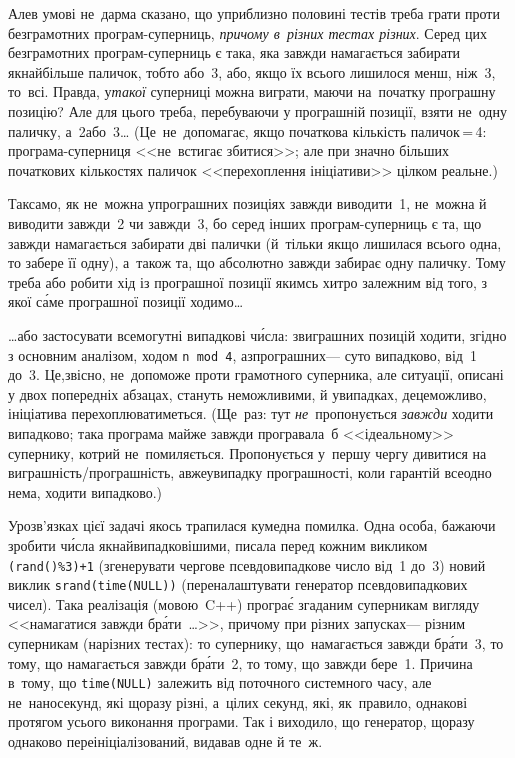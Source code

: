 Але\nolinebreak[2] в умові не~дарма сказано, що у\nolinebreak[3] приблизно половині тестів треба грати проти безграмотних програм-суперниць, \emph{причому в~різних тестах різних}. Серед цих безграмотних програм-суперниць є така, яка завжди намагається забирати якнайбільше паличок, тобто або~3, або, якщо їх всього лишилося менш, ніж~3, то~всі. Правда, у\nolinebreak[2] \emph{такої} суперниці можна виграти, маючи на~початку програшну позицію? Але для цього треба, перебуваючи у програшній позиції, взяти не~одну паличку, 
а~2\nolinebreak[3] або~3\dots{} 
(Це~не~допомагає, якщо початкова кількість паличок$\,$=$\,$4: програма-суперниця <<не~встигає збитися>>; але при значно більших початкових кількостях паличок <<перехоплення ініціативи>> цілком реальне.)

Так\nolinebreak[2] само, як не~можна у\nolinebreak[3] програшних позиціях завжди виводити~1, не~можна й виводити завжди~2 чи завжди~3, бо серед інших програм-суперниць є та, що завжди намагається забирати дві палички (й~тільки якщо лишилася всього одна, то забере її одну), а~також та, що абсолютно завжди забирає одну паличку. Тому треба або робити хід із програшної позиції якимсь хитро залежним від того, з якої с\'{а}ме програшної позиції ходимо\dots

\label{text:random-in-simple-sticks-game}\dots{}або застосувати всемогутні випадкові ч\'{и}сла: з\nolinebreak[2] виграшних позицій ходити, згідно з основним аналізом, ходом \texttt{n~mod~4}, а\nolinebreak[3] з\nolinebreak[3] програшних\nolinebreak[3] --- суто випадково, від~1 до~3. Це,\nolinebreak[3] звісно, не~допоможе проти грамотного суперника, але ситуації, описані у двох попередніх абзацах, стануть неможливими, й у\nolinebreak[2] випадках, де\nolinebreak[3] це\nolinebreak[3] можливо, ініціатива перехоплюватиметься.
%
(Ще~раз: тут \emph{не}~пропонується \emph{завжди} ходити випадково; така програма майже завжди програвала~б <<ідеальному>> супернику, котрий не~помиляється. Пропонується у~першу чергу дивитися на виграш\-ність/\linebreak[2]про\-граш\-ність, а\nolinebreak[3] вже\nolinebreak[2] у\nolinebreak[3] випадку програшності, коли гарантій все\nolinebreak[3] одно нема, ходити випадково.)

У\nolinebreak[3] розв'язках цієї задачі якось трапилася кумедна помилка. Одна особа, бажаючи зробити %
ч\'{и}сла якнайвипадковішими, писала перед кожним викликом \texttt{(rand()\%3)+1} (згенерувати чергове псевдовипадкове число від~1 до~3) новий виклик \texttt{srand(time(NULL))} (переналаштувати генератор псевдовипадкових чисел). Така реалізація (мовою~C++) програ\'{є} згаданим суперникам вигляду <<намагатися завжди бр\'{а}ти~\dots>>, причому при різних запусках\nolinebreak[3] --- різним суперникам (на\nolinebreak[2] різних тестах): то супернику, що~намагається завжди бр\'{а}ти~3, то тому, що намагається завжди бр\'{а}ти~2, то тому, що завжди бере~1. Причина в~тому, що %
\texttt{time(NULL)} залежить від поточного системного часу, але не~наносекунд, які щоразу різні, а~цілих секунд, які, як~правило, однакові протягом усього виконання програми. Так і виходило, що генератор, щоразу однаково переініціалізований, видавав одне й те~ж.\label{text:sticks-simple-end}

